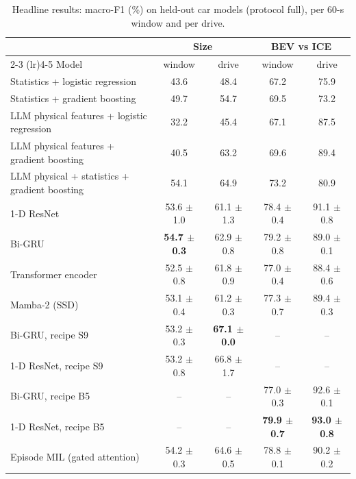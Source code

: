 \begin{table}[t]
\centering
\small
\caption{Headline results: macro-F1 (\%) on held-out car models (protocol full), per 60-s window and per drive.}
\label{tab:headline}
\begin{tabular}{lcccc}
\toprule
 & \multicolumn{2}{c}{Size} & \multicolumn{2}{c}{BEV vs ICE} \\
\cmidrule(lr){2-3} \cmidrule(lr){4-5}
Model & window & drive & window & drive \\
\midrule
Statistics + logistic regression & 43.6 & 48.4 & 67.2 & 75.9 \\
Statistics + gradient boosting & 49.7 & 54.7 & 69.5 & 73.2 \\
LLM physical features + logistic regression & 32.2 & 45.4 & 67.1 & 87.5 \\
LLM physical features + gradient boosting & 40.5 & 63.2 & 69.6 & 89.4 \\
LLM physical + statistics + gradient boosting & 54.1 & 64.9 & 73.2 & 80.9 \\
1-D ResNet & 53.6 $\pm$ 1.0 & 61.1 $\pm$ 1.3 & 78.4 $\pm$ 0.4 & 91.1 $\pm$ 0.8 \\
Bi-GRU & \textbf{54.7 $\pm$ 0.3} & 62.9 $\pm$ 0.8 & 79.2 $\pm$ 0.8 & 89.0 $\pm$ 0.1 \\
Transformer encoder & 52.5 $\pm$ 0.8 & 61.8 $\pm$ 0.9 & 77.0 $\pm$ 0.4 & 88.4 $\pm$ 0.6 \\
Mamba-2 (SSD) & 53.1 $\pm$ 0.4 & 61.2 $\pm$ 0.3 & 77.3 $\pm$ 0.7 & 89.4 $\pm$ 0.3 \\
Bi-GRU, recipe S9 & 53.2 $\pm$ 0.3 & \textbf{67.1 $\pm$ 0.0} & -- & -- \\
1-D ResNet, recipe S9 & 53.2 $\pm$ 0.8 & 66.8 $\pm$ 1.7 & -- & -- \\
Bi-GRU, recipe B5 & -- & -- & 77.0 $\pm$ 0.3 & 92.6 $\pm$ 0.1 \\
1-D ResNet, recipe B5 & -- & -- & \textbf{79.9 $\pm$ 0.7} & \textbf{93.0 $\pm$ 0.8} \\
Episode MIL (gated attention) & 54.2 $\pm$ 0.3 & 64.6 $\pm$ 0.5 & 78.8 $\pm$ 0.1 & 90.2 $\pm$ 0.2 \\
\bottomrule
\end{tabular}
\end{table}
